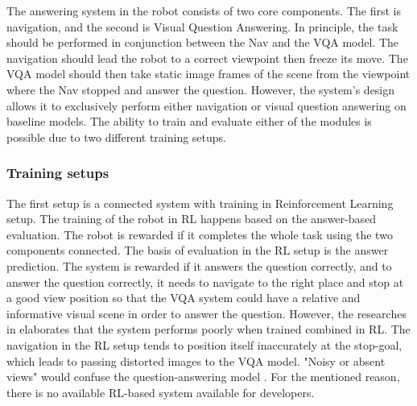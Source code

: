 The answering system in the robot consists of two core components. The first is navigation, and the second is Visual Question Answering. In principle, the task should be performed in conjunction between the Nav and the VQA model. The navigation should lead the robot to a correct viewpoint then freeze its move. The VQA model should then take static image frames of the scene from the viewpoint where the Nav stopped and answer the question. 
However, the system's design allows it to exclusively perform either navigation or visual question answering on baseline models. The ability to train and evaluate either of the modules is possible due to two different training setups.

\subsubsection{Training setups}

The first setup is a connected system with training in Reinforcement Learning setup. %
The training of the robot in RL happens based on the answer-based evaluation. The robot is rewarded if it completes the whole task using the two components connected.  The basis of evaluation in the RL setup is the answer prediction. The system is rewarded if it answers the question correctly, and to answer the question correctly, it needs to navigate to the right place and stop at a good view position so that the VQA system could have a relative and informative visual scene in order to answer the question. However, the researches in \cite{embodiedqa} elaborates that the system performs poorly when trained combined in RL. The navigation in the RL setup tends to position itself inaccurately at the stop-goal, which leads to passing distorted images to the VQA model. "Noisy or absent views" would confuse the question-answering model \cite{embodiedqa}. For the mentioned reason, there is no available RL-based system available for developers. 

